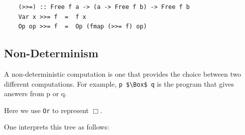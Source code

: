 \documentclass[a4paper,12pt]{article}
\theoremstyle{remark}
\begin{document}
\begin{lstlisting}
    (>>=) :: Free f a -> (a -> Free f b) -> Free f b
    Var x >>= f  =  f x
    Op op >>= f  =  Op (fmap (>>= f) op)  \end{lstlisting}

\subsection{Non-Determinism}

A non-deterministic computation is one that provides the choice between two different computations.
For example, \lstinline{p $\Box$ q} is the program that gives answers from p or q.

\begin{figure}[H]
  \centering
\end{figure}

Here we use \lstinline{Or} to represent $\Box$.

\begin{figure}[H]
  \centering
\end{figure}

One interprets this tree as follows:

\begin{figure}[H]
  \centering
\end{figure}
\end{document}
